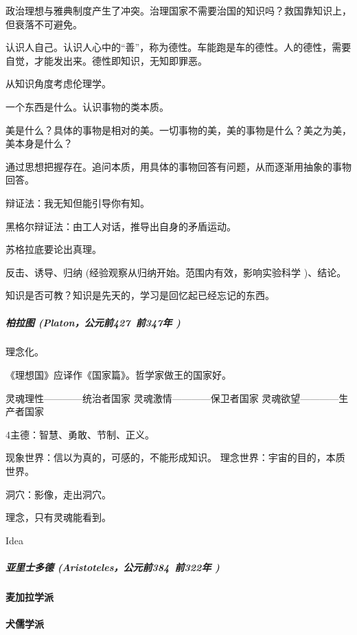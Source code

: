 \documentclass[UTF8]{../RepresentationUniverse}
\begin{document}
            政治理想与雅典制度产生了冲突。治理国家不需要治国的知识吗？救国靠知识上，但衰落不可避免。
    
            认识人自己。认识人心中的“善”，称为德性。车能跑是车的德性。人的德性，需要自觉，才能发出来。德性即知识，无知即罪恶。
    
            从知识角度考虑伦理学。
    
            一个东西是什么。认识事物的类本质。
    
            美是什么？具体的事物是相对的美。一切事物的美，美的事物是什么？美之为美，美本身是什么？
    
            通过思想把握存在。追问本质，用具体的事物回答有问题，从而逐渐用抽象的事物回答。
    
            辩证法：我无知但能引导你有知。
    
            黑格尔辩证法：由工人对话，推导出自身的矛盾运动。
    
            苏格拉底要论出真理。
    
            反击、诱导、归纳 (经验观察从归纳开始。范围内有效，影响实验科学 )、结论。
    
            知识是否可教？知识是先天的，学习是回忆起已经忘记的东西。


            \subparagraph{柏拉图 (Platon，公元前427~前347年 )}

            理念化。

            《理想国》应译作《国家篇》。哲学家做王的国家好。
    
            灵魂理性————统治者国家
            灵魂激情————保卫者国家
            灵魂欲望————生产者国家
    
            4主德：智慧、勇敢、节制、正义。
    
            现象世界：信以为真的，可感的，不能形成知识。
            理念世界：宇宙的目的，本质世界。
    
            洞穴：影像，走出洞穴。
    
            理念，只有灵魂能看到。
    
            Idea

            \subparagraph{亚里士多德 (Aristoteles，公元前384~前322年 )}
        \paragraph{麦加拉学派}
        \paragraph{犬儒学派}
\end{document}
